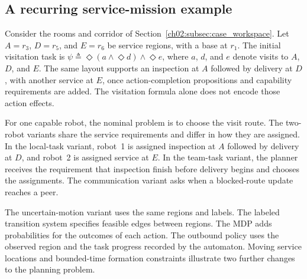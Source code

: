 \begin{revision}
\subsection{A recurring service-mission example}
\label{ch01:subsec:recurring-example}

Consider the rooms and corridor of Section~\ref{ch02:subsec:case_workspace}.
Let $A=r_3$, $D=r_5$, and $E=r_6$ be service regions, with a base at $r_1$.
The initial visitation task is
$\psi\triangleq\Diamond(a\wedge\Diamond d)\wedge\Diamond e$,
where $a$, $d$, and $e$ denote visits to $A$, $D$, and $E$.
The same layout supports an inspection at $A$ followed by delivery at $D$,
with another service at $E$, once action-completion propositions and
capability requirements are added. The visitation formula alone does not
encode those action effects.

For one capable robot, the nominal problem is to choose the visit route.
The two-robot variants share the service requirements and differ in how
they are assigned. In the local-task variant, robot~1 is assigned
inspection at $A$ followed by delivery at $D$, and robot~2 is assigned
service at $E$. In the team-task variant, the planner receives the
requirement that inspection finish before delivery begins and chooses
the assignments.
The communication variant asks when a blocked-route update reaches a peer.

The uncertain-motion variant uses the same regions and labels. The labeled
transition system specifies feasible edges between regions. The MDP adds
probabilities for the outcomes of each action. The outbound policy uses
the observed region and the task progress recorded by the automaton.
Moving service locations and bounded-time
formation constraints illustrate two further changes to the planning problem.


\end{revision}
